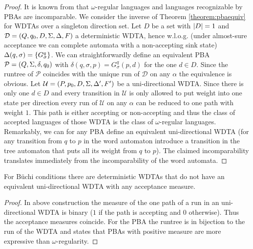 \begin{proof}
  It is known from \cite[Theorem 4 (b), (c)]{DecProblemsForProbAuto} that
  $\omega$-regular languages and languages recognizable by \acp{PBA} are
  incomparable. We consider the inverse of Theorem \ref{theorem:pbaequiv} for
  \acp{WDTA} over a singleton direction set. Let $D$ be a set with $\left\vert{D}\right\vert=1$
  and $\mathcal{D} = \left(Q, q_{0}, D, \Sigma, \Delta, F\right)$ a deterministic
  \ac{WDTA}, hence w.l.o.g. (under almost-sure acceptance we can complete
  automata with a non-accepting sink state)
  $\Delta(q,\sigma) = \left\{G^{q}_{\sigma}\right\}$. We can straightforwardly define an
  equivalent \ac{PBA} $\mathcal{P} = \left(Q, \Sigma, \delta, q_{0}\right)$ with
  $\delta(q, \sigma, p) = G^{q}_{\sigma}(p, d)$ for the one $d\in D$. Since the
  runtree of $\mathcal{P}$ coincides with the unique run of $\mathcal{D}$ on
  any $\alpha$ the equivalence is obvious. Let
  $\mathcal{U} = \left(P, p_{0}, D, \Sigma, \Delta', F'\right)$ be a uni-directional
  \ac{WDTA}. Since there is only one $d\in D$ and every transition in
  $\mathcal{U}$ is only allowed to put weight into one state per direction
  every run of $\mathcal{U}$ on any $\alpha$ can be reduced to one path with
  weight $1$. This path is either accepting or non-accepting and thus
  the class of accepted languages of those \ac{WDTA} is the class of
  $\omega$-regular languages. Remarkably, we can for any \ac{PBA} define an
  equivalent uni-directional \ac{WDTA} (for any transition from $q$ to $p$ in
  the word automaton introduce a transition in the tree automaton that puts all
  its weight from $q$ to $p$). The claimed incomparability translates
  immediately from the incomparability of the word automata.
\end{proof}
\begin{corollary}
  For Büchi conditions there are deterministic \acp{WDTA} that do not have an
  equivalent uni-directional \ac{WDTA} with any acceptance measure.
\end{corollary}
\begin{proof}
  In above construction the measure of the one path of a run in an
  uni-directional \ac{WDTA} is binary ($1$ if the path is accepting and $0$
  otherwise). Thus the acceptance measures coincide. For the \ac{PBA} the
  runtree is in bijection to the run of the \ac{WDTA} and
  \cite[Theorem 4]{RecOmeLangProbAuto} states that \acp{PBA} with positive
  measure are more expressive than $\omega$-regularity.
\end{proof}

